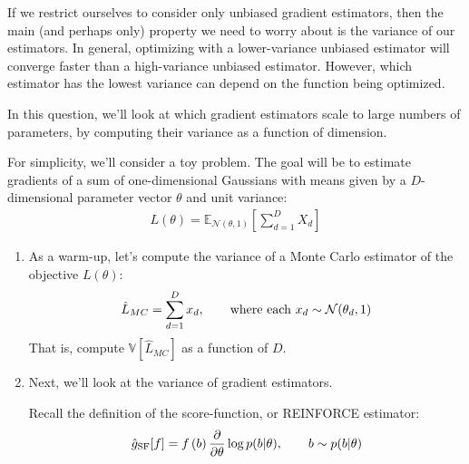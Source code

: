 \documentclass{harvardml}
\newcommand{\distNorm}{\mathcal{N}}
\newcommand{\var}{\mathbb{V}}
\newcommand{\E}{\mathbb{E}}
\newcommand{\PT}{\frac{\partial}{\partial \theta}}
\theoremstyle{plain}
\begin{document}









\begin{problem}

If we restrict ourselves to consider only unbiased gradient estimators, then the main (and perhaps only) property we need to worry about is the variance of our estimators.
In general, optimizing with a lower-variance unbiased estimator will converge faster than a high-variance unbiased estimator.
However, which estimator has the lowest variance can depend on the function being optimized.

In this question, we'll look at which gradient estimators scale to large numbers of parameters, by computing their variance as a function of dimension.

For simplicity, we'll consider a toy problem.
The goal will be to estimate gradients of a sum of one-dimensional Gaussians with means given by a $D$-dimensional parameter vector $\theta$ and unit variance:
%
\begin{align}
L(\theta) = \E_{\distNorm(\theta, 1)} \left[ \sum_{d=1}^D X_d \right]
\end{align}



\begin{enumerate}[label=(\alph*)]
\item As a warm-up, let's compute the variance of a Monte Carlo estimator of the objective $L(\theta)$:
%
\begin{align}
\hat L_{MC} = \sum_{d=1}^D x_d, \qquad \textnormal{where each } x_d \sim \distNorm(\theta_d, 1)
\end{align}
%
That is, compute $\var \left[ \hat L_{MC} \right]$ as a function of $D$.

\item Next, we'll look at the variance of gradient estimators.

Recall the definition of the score-function, or REINFORCE estimator:
%
\begin{align}
\hat g_\textnormal{SF}[f] = f \left( b \right) \PT \log p(b | \theta), \qquad b \sim p(b | \theta)
\end{align}
%


\end{enumerate}
\end{problem}
\end{document}
